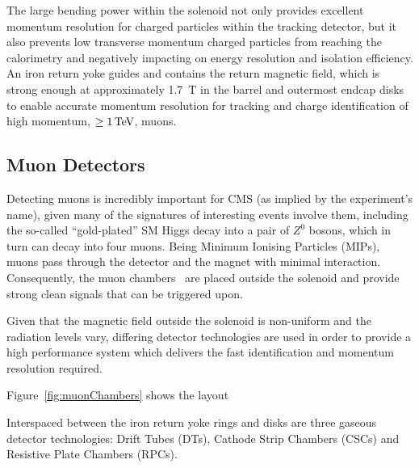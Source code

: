 The large bending power within the solenoid not only provides excellent momentum resolution for charged particles within the tracking detector, but it also prevents low transverse momentum charged particles from reaching the calorimetry and negatively impacting on energy resolution and isolation efficiency.
An iron return yoke guides and contains the return magnetic field, which is strong enough at approximately 1.7~T in the barrel and outermost endcap disks to enable accurate momentum resolution for tracking and charge identification of high momentum, \ie $\geq 1\,\text{Te\hspace{-.08em}V}$, muons.


\subsection{Muon Detectors}\label{subsec:muon chambers}
Detecting muons is incredibly important for CMS (as implied by the experiment’s name), given many of the signatures of interesting events involve them, including the so-called “gold-plated” SM Higgs decay into a pair of $Z^{0}$ bosons, which in turn can decay into four muons. 
Being Minimum Ionising Particles (MIPs), muons pass through the detector and the magnet with minimal interaction.
Consequently, the muon chambers~\cite{CMS:1997iti} are placed outside the solenoid and provide strong clean signals that can be triggered upon.

Given that the magnetic field outside the solenoid is non-uniform and the radiation levels vary, differing detector technologies are used in order to provide a high performance system which delivers the fast identification and momentum resolution required. 

Figure~\ref{fig:muonChambers} shows the layout 

Interspaced between the iron return yoke rings and disks are three gaseous detector technologies: Drift Tubes (DTs), Cathode Strip Chambers (CSCs) and Resistive Plate Chambers (RPCs).

